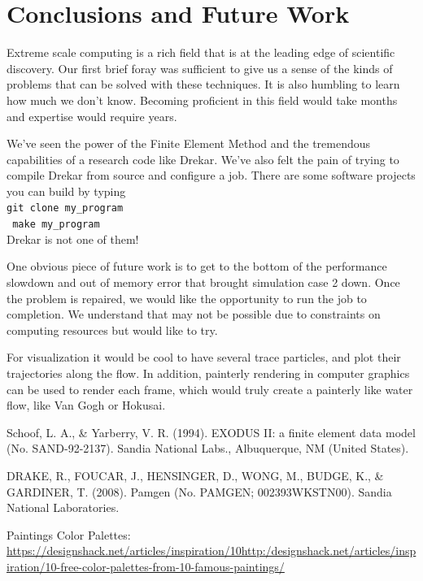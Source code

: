 \documentclass[11pt]{article} %
\newcommand{\tty}[1]{\texttt{#1}}
\begin{document}
\newpage
\section{Conclusions and Future Work}
Extreme scale computing is a rich field that is at the leading edge of scientific discovery.
Our first brief foray was sufficient to give us a sense of the kinds of problems that can
be solved with these techniques.  
It is also humbling to learn how much we don't know.  
Becoming proficient in this field would take months and expertise would require years.

We've seen the power of the Finite Element Method and the tremendous capabilities of 
a research code like Drekar.  
We've also felt the pain of trying to compile Drekar from source and configure a job.
There are some software projects you can build by typing\\
\tty{git clone my\_program}\\
\tty{ make my\_program} \\
Drekar is not one of them!

One obvious piece of future work is to get to the bottom of the performance slowdown 
and out of memory error that brought simulation case 2 down.
Once the problem is repaired, we would like the opportunity to run the job to completion.
We understand that may not be possible due to constraints on computing resources
but would like to try. 

For visualization it would be cool to have several trace particles, and plot their trajectories along the flow. In addition, painterly rendering in computer graphics can be used to render each frame, which would truly create a painterly like water flow, like Van Gogh or Hokusai.


\begin{thebibliography}{9}
Schoof, L. A., \& Yarberry, V. R. (1994). EXODUS II: a finite element data model (No. SAND-92-2137). Sandia National Labs., Albuquerque, NM (United States).

DRAKE, R., FOUCAR, J., HENSINGER, D., WONG, M., BUDGE, K., \& GARDINER, T. (2008). Pamgen (No. PAMGEN; 002393WKSTN00). Sandia National Laboratories.

Paintings Color Palettes: \url{https://designshack.net/articles/inspiration/10http:/designshack.net/articles/inspiration/10-free-color-palettes-from-10-famous-paintings/}

\end{thebibliography}
\end{document}
